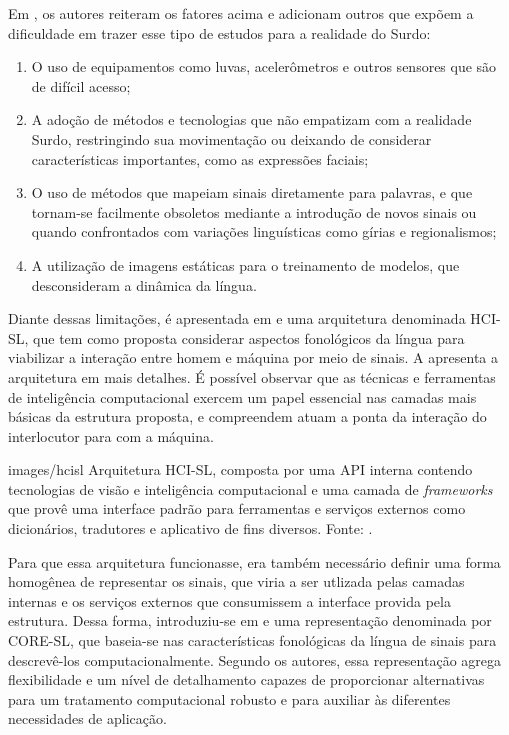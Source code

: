 Em \cite{antunes-hcisl-2011}, os autores reiteram os fatores acima e adicionam outros que expõem a dificuldade em trazer esse tipo de estudos para a realidade do Surdo: 
\begin{enumerate}
    \item O uso de equipamentos como luvas, acelerômetros e outros sensores que são de difícil acesso; 
    \item A adoção de métodos e tecnologias que não empatizam com a realidade Surdo, restringindo sua movimentação ou deixando de considerar características importantes, como as expressões faciais;
    \item O uso de métodos que mapeiam sinais diretamente para palavras, e que tornam-se facilmente obsoletos mediante a introdução de novos sinais ou quando confrontados com variações linguísticas como gírias e regionalismos; 
    \item A utilização de imagens estáticas para o treinamento de modelos, que desconsideram a dinâmica da língua.
\end{enumerate}

Diante dessas limitações, é apresentada em \cite{antunes-hcisl-2011} e \cite{garcia-2013} uma arquitetura denominada HCI-SL, que tem como proposta considerar aspectos fonológicos da língua para viabilizar a interação entre homem e máquina por meio de sinais. A  apresenta a arquitetura em mais detalhes. É possível observar que as técnicas e ferramentas de inteligência computacional exercem um papel essencial nas camadas mais básicas da estrutura proposta, e compreendem atuam a ponta da interação do interlocutor para com a máquina.

    {images/hcisl}
    {Arquitetura HCI-SL, composta por uma API interna contendo tecnologias de visão e inteligência computacional e uma camada de \textit{frameworks} que provê uma interface padrão para ferramentas e serviços externos como dicionários, tradutores e aplicativo de fins diversos. Fonte: \cite{antunes-hcisl-2011}.}

Para que essa arquitetura funcionasse, era também necessário definir uma forma homogênea de representar os sinais, que viria a ser utlizada pelas camadas internas e os serviços externos que consumissem a interface provida pela estrutura. Dessa forma, introduziu-se em \cite{antunes-2011} e \cite{antunes-2015} uma representação denominada por CORE-SL, que baseia-se nas características fonológicas da língua de sinais para descrevê-los computacionalmente. Segundo os autores, essa representação agrega flexibilidade e um nível de detalhamento capazes de proporcionar alternativas para um tratamento computacional robusto e para auxiliar às diferentes necessidades de aplicação. 

